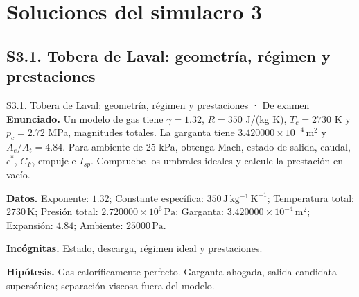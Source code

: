 \chapter{Soluciones del simulacro 3}
\section{S3.1. Tobera de Laval: geometría, régimen y prestaciones}
\begin{studiumworked}{S3.1. Tobera de Laval: geometría, régimen y prestaciones · De examen}
\textbf{Enunciado.} Un modelo de gas tiene $\gamma=1.32$, $R=350$ J/(kg K), $T_c=2730$ K y $p_c=2.72$ MPa, magnitudes totales. La garganta tiene $3.420000\times10^{-4}\,\mathrm{m^2}$ y $A_e/A_t=4.84$. Para ambiente de 25 kPa, obtenga Mach, estado de salida, caudal, $c^*$, $C_F$, empuje e $I_{sp}$. Compruebe los umbrales ideales y calcule la prestación en vacío.

\textbf{Datos.} Exponente: $1.32$; Constante específica: $350\,\mathrm{J\,kg^{-1}\,K^{-1}}$; Temperatura total: $2730\,\mathrm{K}$; Presión total: $2.720000\times10^{6}\,\mathrm{Pa}$; Garganta: $3.420000\times10^{-4}\,\mathrm{m^2}$; Expansión: $4.84$; Ambiente: $25000\,\mathrm{Pa}$.

\textbf{Incógnitas.} Estado, descarga, régimen ideal y prestaciones.

\textbf{Hipótesis.} Gas caloríficamente perfecto. Garganta ahogada, salida candidata supersónica; separación viscosa fuera del modelo.


\end{studiumworked}
